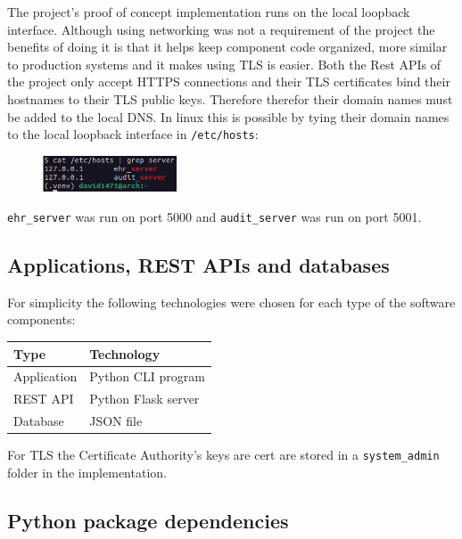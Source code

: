 \documentclass[11pt]{article}
\begin{document}
\begin{flushleft}
The project's proof of concept implementation runs on the local loopback interface. Although using networking was not a requirement of the project the benefits of doing it is that it helps keep component code organized, more similar to production systems and it makes using TLS is easier. Both the Rest APIs of the project only accept HTTPS connections and their TLS certificates bind their hostnames to their TLS public keys. Therefore therefor their domain names must be added to the local DNS. In linux this is possible by tying their domain names to the local loopback interface in \verb+/etc/hosts+:

\begin{figure}[h!]
	\begin{center}
		\includegraphics[width = 150px]{images/dns_config.png}
	\end{center}
\end{figure}

\verb+ehr_server+ was run on port 5000 and \verb+audit_server+ was run on port 5001.

\subsection{Applications, REST APIs and databases}

For simplicity the following technologies were chosen for each type of the software components:

\begin{tabularx}{0.8\textwidth} { 
		| >{\raggedright\arraybackslash}X 
		| >{\raggedright\arraybackslash}X | }
	\hline
	\textbf{Type} & \textbf{Technology} \\
	\hline
	Application  & Python CLI program  \\
	\hline
	REST API  & Python Flask server  \\
	\hline
	Database  & JSON file  \\
	\hline
\end{tabularx}

For TLS the Certificate Authority's keys are cert are stored in a \verb+system_admin+ folder in the implementation.

\subsection{Python package dependencies}


\end{flushleft}
\end{document}
